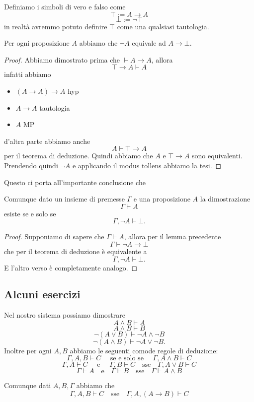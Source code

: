 \documentclass[11pt]{scrartcl}
\begin{document}
	\begin{definition}
		Definiamo i simboli di vero e falso come
		$$\top:= A\to A$$
		$$\bot := \lnot \top$$
		in realtà avremmo potuto definire $\top$ come una qualsiasi tautologia.
	\end{definition}
	\begin{metateorema}
		Per ogni proposizione $A$ abbiamo che
		$\lnot A $ equivale ad $A\to \bot$.
	\end{metateorema}
	\begin{proof}
		Abbiamo dimostrato prima che $\vdash A\to A$, allora 
		$$ \top\to A \vdash A$$
		infatti abbiamo
		\begin{itemize}
			\item $(A\to A)\to A$ hyp
			\item $A\to A$ tautologia
			\item $A$ MP
		\end{itemize}
		d'altra parte abbiamo anche 
		$$A\vdash \top\to A$$
		per il teorema di deduzione. Quindi abbiamo che $A$ e $\top \to A$ sono equivalenti. Prendendo quindi $\lnot A$ e applicando il modus tollens abbiamo la tesi.
	\end{proof}
	Questo ci porta all'importante conclusione che
	\begin{metateorema}
		Comunque dato un insieme di premesse $\Gamma$ e una proposizione $A$ la dimostrazione
		$$\Gamma \vdash A$$
		esiste se e solo se
		$$\Gamma,\lnot A \vdash \bot.$$
	\end{metateorema}
	\begin{proof}
		Supponiamo di sapere che $\Gamma \vdash A$, allora per il lemma precedente
		$$\Gamma\vdash \lnot A\to \bot$$
		che per il teorema di deduzione è equivalente a 
		$$\Gamma, \lnot A \vdash \bot.$$
		E l'altro verso è completamente analogo. 
	\end{proof}
	
	\subsection{Alcuni esercizi}
	
	\begin{theorem}
		Nel nostro sistema possiamo dimostrare
		$$A\land B \vdash A$$
		$$A\land B \vdash B$$
		$$\lnot(A\lor B)\vdash \lnot A \land \lnot B$$
		$$\lnot (A \land B) \vdash \lnot A \lor \lnot B.$$
		Inoltre per ogni $A,B$ abbiamo le seguenti comode regole di deduzione:
		$$\Gamma,A,B \vdash C \quad\text{ se e solo se }\quad \Gamma,A \land B \vdash C$$
		$$\Gamma,A\vdash C \quad \text{ e } \quad  \Gamma, B \vdash C \quad \text{sse} \quad \Gamma,A\lor B \vdash C$$
		$$
		\Gamma \vdash A \quad \text{e} \quad \Gamma\vdash B \quad \text{sse} \quad \Gamma \vdash A\land B
		$$
	\end{theorem}
	\begin{metateorema}
		Comunque dati $A,B,\Gamma$ abbiamo che 
		$$\Gamma,A,B \vdash C \quad\text{sse}\quad \Gamma,A,(A\to B) \vdash C $$ 
	\end{metateorema}
	\newpage
	
\end{document}
